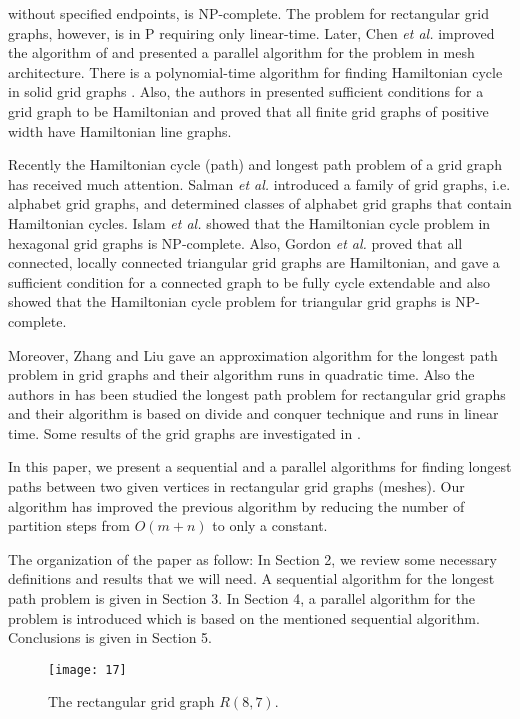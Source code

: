 \documentclass[preprint,12pt]{elsarticle}
\begin{document}
without specified endpoints, is NP-complete. The problem for
rectangular grid graphs, however, is in P requiring only
linear-time. Later, Chen \textit{et al.} \cite{CST:AFAFCHPIM}
improved the algorithm of \cite{IPS:HPIGG} and presented a parallel
algorithm for the problem in mesh architecture. There is a
polynomial-time algorithm for finding Hamiltonian cycle in solid
grid graphs \cite{LU:HCISGG}. Also, the authors in \cite{CT:HPOGG}
presented sufficient conditions for a grid graph to be Hamiltonian
and proved that all finite grid graphs of positive width have
Hamiltonian line graphs.\par Recently the Hamiltonian cycle (path)
and longest path problem of a grid graph has received much
attention. Salman \textit{et al.} \cite{AEB:SSAG} introduced a
family of grid graphs, i.e. alphabet grid graphs, and determined
classes of alphabet grid graphs that contain Hamiltonian cycles.
Islam \textit{et al.} \cite{Imnrx:hcihgg} showed that the
Hamiltonian cycle problem in hexagonal grid graphs is NP-complete.
Also, Gordon \textit{et al.} \cite{vyf:hpotgg} proved that all
connected, locally connected triangular grid graphs are Hamiltonian,
and gave a sufficient condition for a connected graph to be fully
cycle extendable and also showed that the Hamiltonian cycle problem
for triangular grid graphs is NP-complete.\par Moreover, Zhang and
Liu \cite{wqz} gave an approximation algorithm for the longest path
problem in grid graphs and their algorithm runs in quadratic time.
Also the authors in \cite{FAA:ALAFFLPIRGG} has been studied the
longest path problem for rectangular grid graphs and their algorithm
is based on divide and conquer technique and runs in linear time.
Some results of the grid graphs are investigated in
\cite{kb:hpiscogg, 6}. \par In this paper, we present a sequential
and a parallel algorithms for finding longest paths between two
given vertices in rectangular grid graphs (meshes). Our algorithm
has improved the previous algorithm \cite{FAA:ALAFFLPIRGG} by
reducing the number of partition steps from $O(m+n)$ to only a
constant.
\par The organization of the paper as follow: In Section 2, we review some necessary definitions
and results that we will need. A sequential algorithm for the
longest path problem is given in Section 3. In Section 4, a parallel
algorithm for the problem is introduced which is based on the
mentioned sequential algorithm. Conclusions is given in Section 5.
\begin{figure}[tb]
  \centering
  \texttt{[image: 17]}
  \caption[]{\small The rectangular grid graph $R(8,7)$.}
\label{bb}
\end{figure}
\end{document}
